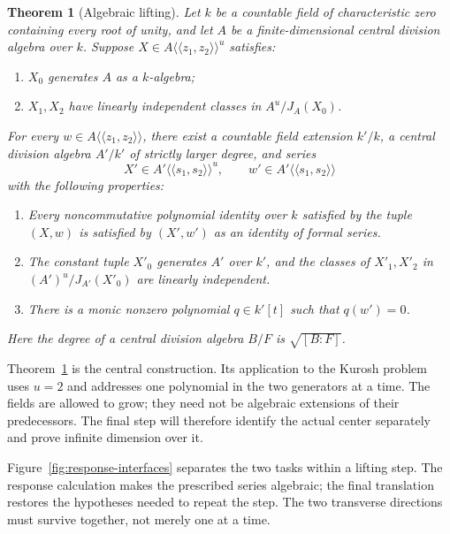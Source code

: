 \documentclass[11pt]{article}
\newtheorem{theorem}{Theorem}[section]
\theoremstyle{definition}
\theoremstyle{remark}
\numberwithin{equation}{section}
\begin{document}
\begin{theorem}[Algebraic lifting]\label{thm:lifting}
Let $k$ be a countable field of characteristic zero containing every root
of unity, and let $A$ be a finite-dimensional central division algebra
over $k$. Suppose
$X\in A\langle\!\langle z_1,z_2\rangle\!\rangle^u$ satisfies:
\begin{enumerate}[label=\textup{(\roman*)}]
\item $X_0$ generates $A$ as a $k$-algebra;
\item $X_1,X_2$ have linearly independent classes in $A^u/J_A(X_0)$.
\end{enumerate}
For every $w\in A\langle\!\langle z_1,z_2\rangle\!\rangle$, there exist
a countable field extension $k'/k$, a central division algebra $A'/k'$ of
strictly larger degree, and series
\[
 X'\in A'\langle\!\langle s_1,s_2\rangle\!\rangle^u,
 \qquad w'\in A'\langle\!\langle s_1,s_2\rangle\!\rangle
\]
with the following properties:
\begin{enumerate}[label=\textup{(\alph*)}]
\item Every noncommutative polynomial identity over $k$ satisfied by the
tuple $(X,w)$ is satisfied by $(X',w')$ as an identity of formal series.
\item The constant tuple $X'_0$ generates $A'$ over $k'$, and the classes
of $X'_1,X'_2$ in $(A')^u/J_{A'}(X'_0)$ are linearly independent.
\item There is a monic nonzero polynomial $q\in k'[t]$ such that $q(w')=0$.
\end{enumerate}
Here the degree of a central division algebra $B/F$ is $\sqrt{[B:F]}$.
\end{theorem}

Theorem~\ref{thm:lifting} is the central construction. Its application to
the Kurosh problem uses $u=2$ and addresses one polynomial in the two
generators at a time. The fields are allowed to grow; they need not be
algebraic extensions of their predecessors. The final step will therefore
identify the actual center separately and prove infinite dimension over it.

Figure~\ref{fig:response-interfaces} separates the two tasks within a
lifting step. The response calculation makes the prescribed series
algebraic; the final translation restores the hypotheses needed to repeat
the step. The two transverse directions must survive together, not merely
one at a time.
\end{document}
